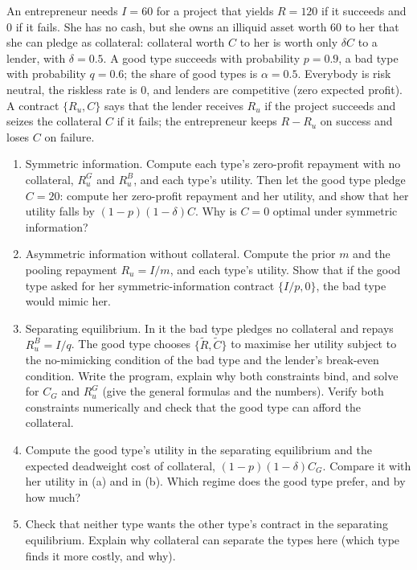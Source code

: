 \documentclass[11pt,a4paper]{article}
\begin{document}
An entrepreneur needs \(I = 60\) for a project that yields \(R = 120\) if it succeeds and 0 if it
fails. She has no cash, but she owns an illiquid asset worth 60 to her that she can pledge as
collateral: collateral worth \(C\) to her is worth only \(\delta C\) to a lender, with
\(\delta = 0.5\). A good type succeeds with probability \(p = 0.9\), a bad type with probability
\(q = 0.6\); the share of good types is \(\alpha = 0.5\). Everybody is risk neutral, the riskless
rate is 0, and lenders are competitive (zero expected profit). A contract \(\{R_u, C\}\) says that
the lender receives \(R_u\) if the project succeeds and seizes the collateral \(C\) if it fails; the
entrepreneur keeps \(R - R_u\) on success and loses \(C\) on failure.

\begin{enumerate}
\def\labelenumi{(\alph{enumi})}
\item
  Symmetric information. Compute each type's zero-profit repayment with no collateral, \(R_u^G\) and
  \(R_u^B\), and each type's utility. Then let the good type pledge \(C = 20\): compute her
  zero-profit repayment and her utility, and show that her utility falls by
  \((1 - p)(1 - \delta)C\). Why is \(C = 0\) optimal under symmetric information?
\item
  Asymmetric information without collateral. Compute the prior \(m\) and the pooling repayment
  \(R_u = I/m\), and each type's utility. Show that if the good type asked for her
  symmetric-information contract \(\{I/p, 0\}\), the bad type would mimic her.
\item
  Separating equilibrium. In it the bad type pledges no collateral and repays \(R_u^B = I/q\). The
  good type chooses \(\{\tilde R, \tilde C\}\) to maximise her utility subject to the no-mimicking
  condition of the bad type and the lender's break-even condition. Write the program, explain why
  both constraints bind, and solve for \(C_G\) and \(R_u^G\) (give the general formulas and the
  numbers). Verify both constraints numerically and check that the good type can afford the
  collateral.
\item
  Compute the good type's utility in the separating equilibrium and the expected deadweight cost of
  collateral, \((1 - p)(1 - \delta)C_G\). Compare it with her utility in (a) and in (b). Which
  regime does the good type prefer, and by how much?
\item
  Check that neither type wants the other type's contract in the separating equilibrium. Explain why
  collateral can separate the types here (which type finds it more costly, and why).
\end{enumerate}
\end{document}
